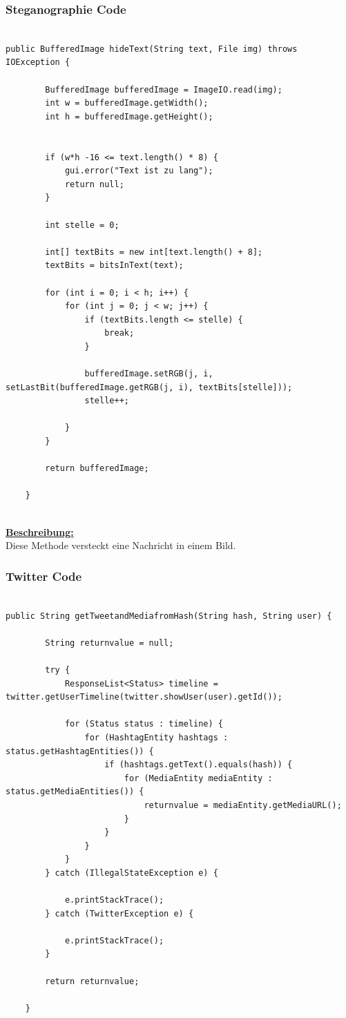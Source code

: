 \documentclass[11pt]{article}
\begin{document}
\subsubsection{Steganographie Code}
\begin{lstlisting}[frame=single]  % Start your code-block

public BufferedImage hideText(String text, File img) throws IOException {

		BufferedImage bufferedImage = ImageIO.read(img);
		int w = bufferedImage.getWidth();
		int h = bufferedImage.getHeight();


		if (w*h -16 <= text.length() * 8) {
			gui.error("Text ist zu lang");
			return null;
		}
		
		int stelle = 0;

		int[] textBits = new int[text.length() + 8];
		textBits = bitsInText(text);

		for (int i = 0; i < h; i++) {
			for (int j = 0; j < w; j++) {
				if (textBits.length <= stelle) {
					break;
				}

				bufferedImage.setRGB(j, i, setLastBit(bufferedImage.getRGB(j, i), textBits[stelle]));
				stelle++;

			}
		}

		return bufferedImage;

	}


\end{lstlisting}

\underline{\textbf{Beschreibung:}}\\
Diese Methode versteckt eine Nachricht in einem Bild.\\

\newpage
\subsubsection{Twitter Code}
\begin{lstlisting}[frame=single]  % Start your code-block

public String getTweetandMediafromHash(String hash, String user) {

		String returnvalue = null;

		try {
			ResponseList<Status> timeline = twitter.getUserTimeline(twitter.showUser(user).getId());

			for (Status status : timeline) {
				for (HashtagEntity hashtags : status.getHashtagEntities()) {
					if (hashtags.getText().equals(hash)) {
						for (MediaEntity mediaEntity : status.getMediaEntities()) {
							returnvalue = mediaEntity.getMediaURL();
						}
					}
				}
			}
		} catch (IllegalStateException e) {

			e.printStackTrace();
		} catch (TwitterException e) {

			e.printStackTrace();
		}

		return returnvalue;

	}
\end{lstlisting}
\end{document}
